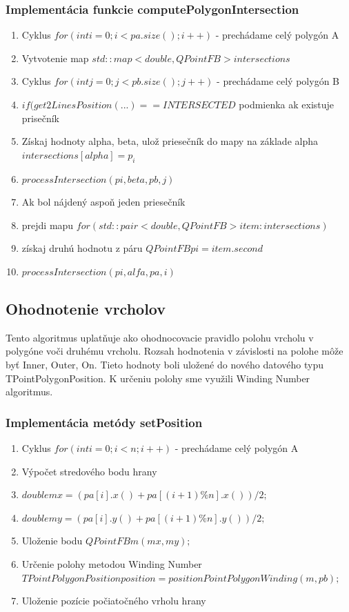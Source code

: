 \documentclass[12pt]{article}
\begin{document}
\subsubsection {Implementácia funkcie computePolygonIntersection}
\begin{enumerate}
\item Cyklus $ for ( int i = 0 ; i < pa.size(); i++)$ - prechádame celý polygón A
\item Vytvotenie map $ std::map< double, QPointFB> intersections$
\item  Cyklus $ for ( int j = 0 ; j < pb.size(); j++)$ - prechádame celý polygón B
\item \hspace {1.0cm}   $ if (get2LinesPosition(...) == INTERSECTED $ podmienka ak existuje prisečník
\item \hspace {1.5cm}  Získaj hodnoty alpha, beta, ulož priesečník do mapy na základe alpha $intersections[alpha]=p_i $
\item \hspace {1.5cm} $processIntersection(pi, beta, pb, j) $
\item \hspace {1.0cm} Ak bol nájdený aspoň jeden priesečník 
\item \hspace {1.0cm} prejdi mapu $for (std::pair<double, QPointFB> item:intersections)$
\item \hspace {1.0cm}získaj druhú hodnotu z páru  $QPointFB pi = item.second$
\item \hspace {1.0cm} $processIntersection(pi, alfa, pa, i) $
\end{enumerate}

\subsection {Ohodnotenie vrcholov}
Tento algoritmus uplatňuje ako ohodnocovacie pravidlo polohu vrcholu v polygóne voči druhému vrcholu. Rozsah hodnotenia v závislosti na polohe môže byť Inner, Outer, On. Tieto hodnoty boli uložené do nového datového typu TPointPolygonPosition. K určeniu polohy sme využili Winding Number algoritmus.

\subsubsection{Implementácia metódy setPosition}
\begin{enumerate}
\item Cyklus $ for(int i = 0; i < n; i++)$ - prechádame celý polygón A
\item Výpočet stredového bodu hrany 
\item \hspace {1.0cm} $double mx = (pa[i].x() + pa[(i + 1)\%n].x()) / 2;$
\item \hspace {1.0cm} $double my = (pa[i].y() + pa[(i + 1)\%n].y()) / 2;$
\item  Uloženie bodu $ QPointFB m(mx, my);$
\item Určenie polohy metodou Winding Number
\newline \hspace {1.0cm}   $TPointPolygonPosition position = positionPointPolygonWinding(m, pb);$
\item \hspace {1.0cm} Uloženie pozície počiatočného vrholu hrany
\end{enumerate}
\end{document}
